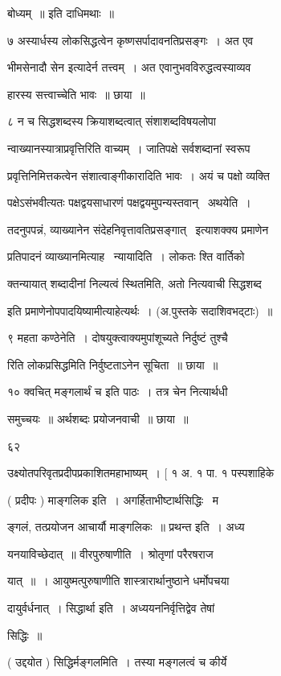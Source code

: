 \documentclass[11pt, openany]{book}
\begin{document}
बोध्यम्~॥ इति दाधिमथाः~॥ 

७ अस्यार्धस्य लोकसिद्धत्वेन कृष्णसर्पादावनतिप्रसङ्गः~। अत एव 

भीमसेनादौ सेन इत्यादेर्न तत्त्वम्~। अत एवानुभवविरुद्धत्वस्याव्यव \textendash\ 

हारस्य सत्त्वाच्चेति भावः~॥ छाया~॥ 

८ न च सिद्धशब्दस्य क्रियाशब्दत्वात् संशाशब्दविषयलोपा \textendash\ 

न्वाख्यानस्यात्राप्रवृत्तिरिति वाच्यम्~। जातिपक्षे सर्वशब्दानां स्वरूप \textendash\ 


प्रवृत्तिनिमित्तकत्वेन संशात्वाङ्गीकारादिति भावः~। अयं च पक्षो व्यक्ति \textendash\ 


पक्षेऽसंभवीत्यतः पक्षद्वयसाधारणं पक्षद्वयमुपन्यस्तवान् \textendash\ अथयेति~। 

तदनुपपन्नं, व्याख्यानेन संदेहनिवृत्तावतिप्रसङ्गात् \textendash\ इत्याशक्क्य प्रमाणेन


प्रतिपादनं व्याख्यानमित्याह \textendash\ न्यायादिति~। {\qt लोकतः} श्ति वार्तिको \textendash\ 

क्तन्यायात् शब्दादीनां निल्यत्वं स्थितमिति, अतो नित्यवाची सिद्धशब्द 

इति प्रमाणेनोपपादयिष्यामीत्याहेत्यर्थः~। (अ.पुस्तके सदाशिवभद्टाः)~॥ 

९ महता कण्ठेनेति~। दोषयुक्त्वाक्यमुपांशूच्यते निर्दुष्टं तुश्चै \textendash\ 

रिति लोकप्रसिद्धमिति निर्वुष्टताऽनेन सूचिता~॥ छाया~॥ 

१० क्वचित् {\qt मङ्गलार्थं च} इति पाठः~। तत्र चेन नित्यार्थधी \textendash\ 

समुच्चयः~॥ अर्थशब्दः प्रयोजनवाची~॥ छाया~॥ 

६२ 

उक्ष्योतपरिवृतप्रदीपप्रकाशितमहाभाष्यम्~। [ १ अ. १ पा. १ पस्पशाहिके 



( प्रदीपः ) माङ्गलिक इति~। अगर्हिताभीष्टार्थसिद्धिः \textendash\ म \textendash\ 

ङ्गलं, तत्प्रयोजन आचार्यौ माङ्गलिकः~॥ प्रथन्त इति~। अध्य \textendash\ 

यनयाविच्छेदात्~॥ वीरपुरुषाणीति~। श्रोतृणां परैरषराज \textendash\ 

यात्~॥~। आयुष्मत्पुरुषाणीति शास्त्रारार्थानुष्ठाने धर्मोपचया \textendash\ 

दायुर्वर्धनात्~। सिद्धार्था इति~। अध्ययननिर्वृत्तिद्वेव तेषां 

सिद्धिः~॥ 

( उद्दयोत ) सिद्धिर्मङ्गलमिति~। तस्या मङ्गलत्वं च कीर्ये 
\end{document}
